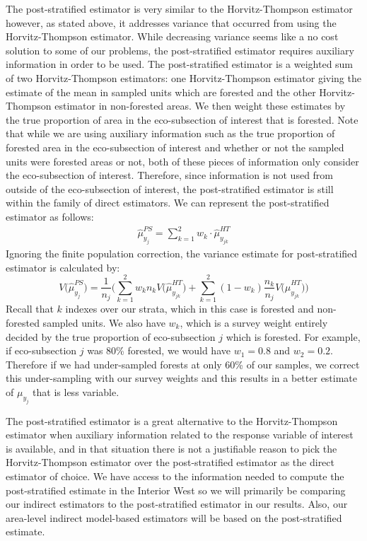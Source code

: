 \documentclass[12pt,twoside]{reedthesis}
\begin{document}
The post-stratified estimator is very similar to the Horvitz-Thompson estimator however, as stated above, it addresses variance that occurred from using the Horvitz-Thompson estimator. While decreasing variance seems like a no cost solution to some of our problems, the post-stratified estimator requires auxiliary information in order to be used. The post-stratified estimator is a weighted sum of two Horvitz-Thompson estimators: one Horvitz-Thompson estimator giving the estimate of the mean in sampled units which are forested and the other Horvitz-Thompson estimator in non-forested areas. We then weight these estimates by the true proportion of area in the eco-subsection of interest that is forested. Note that while we are using auxiliary information such as the true proportion of forested area in the eco-subsection of interest and whether or not the sampled units were forested areas or not, both of these pieces of information only consider the eco-subsection of interest. Therefore, since information is not used from outside of the eco-subsection of interest, the post-stratified estimator is still within the family of direct estimators. We can represent the post-stratified estimator as follows:
\begin{align}
\hat\mu_{y_j}^{PS} = \sum_{k=1}^{2} w_k \cdot \hat\mu_{y_{jk}}^{HT}
\end{align}
Ignoring the finite population correction, the variance estimate for post-stratified estimator is calculated by:
\[
V\Big(\hat \mu_{y_j}^{PS}\Big) = 
\frac{1}{n_j} \Bigg( \sum_{k=1}^{2} w_k n_k V\Big(\hat\mu_{y_{jk}}^{HT}\Big) + 
\sum_{k=1}^{2} (1 - w_k) \frac{n_k}{n_j} V\Big(\hat\mu_{y_{jk}}^{HT}\Big) \Bigg)
\]
Recall that \(k\) indexes over our strata, which in this case is forested and non-forested sampled units. We also have \(w_k\), which is a survey weight entirely decided by the true proportion of eco-subsection \(j\) which is forested. For example, if eco-subsection \(j\) was 80\% forested, we would have \(w_1 = 0.8\) and \(w_2 = 0.2\). Therefore if we had under-sampled forests at only 60\% of our samples, we correct this under-sampling with our survey weights and this results in a better estimate of \(\mu_{y_j}\) that is less variable.

The post-stratified estimator is a great alternative to the Horvitz-Thompson estimator when auxiliary information related to the response variable of interest is available, and in that situation there is not a justifiable reason to pick the Horvitz-Thompson estimator over the post-stratified estimator as the direct estimator of choice. We have access to the information needed to compute the post-stratified estimate in the Interior West so we will primarily be comparing our indirect estimators to the post-stratified estimator in our results. Also, our area-level indirect model-based estimators will be based on the post-stratified estimate.
\end{document}
